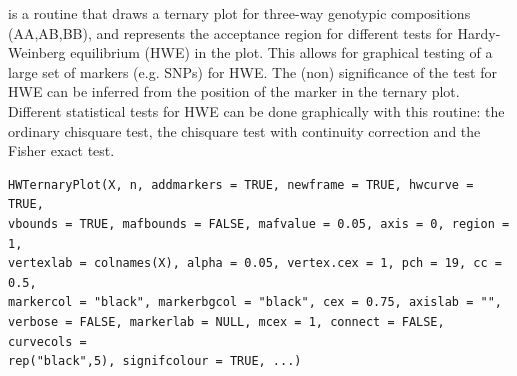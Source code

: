 \documentclass[a4paper]{article}
\begin{document}
\begin{Description}\relax
{} is a routine that draws a ternary plot for three-way genotypic compositions (AA,AB,BB), and represents
the acceptance region for different tests for Hardy-Weinberg equilibrium (HWE) in the plot. This allows for graphical
testing of a large set of markers (e.g. SNPs) for HWE. The (non) significance of the test
for HWE can be inferred from the position of the marker in the ternary plot. Different statistical tests for HWE
can be done graphically with this routine: the ordinary chisquare test, the chisquare test with continuity
correction and the Fisher exact test.
\end{Description}
\begin{Usage}
\begin{verbatim}
HWTernaryPlot(X, n, addmarkers = TRUE, newframe = TRUE, hwcurve = TRUE, 
vbounds = TRUE, mafbounds = FALSE, mafvalue = 0.05, axis = 0, region = 1, 
vertexlab = colnames(X), alpha = 0.05, vertex.cex = 1, pch = 19, cc = 0.5, 
markercol = "black", markerbgcol = "black", cex = 0.75, axislab = "", 
verbose = FALSE, markerlab = NULL, mcex = 1, connect = FALSE, curvecols = 
rep("black",5), signifcolour = TRUE, ...)
\end{verbatim}
\end{Usage}
\end{document}
